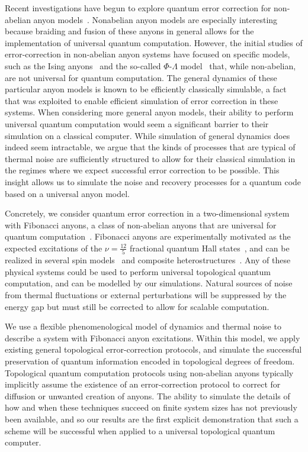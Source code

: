 Recent investigations have begun to
explore quantum error correction for non-abelian anyon
models~\cite{Brell2013, Wootton2013, Hutter2014, Wootton2015b, Hutter2015continuous}.
Nonabelian anyon models are especially interesting 
because braiding and fusion of
these anyons in general allows for the implementation of universal quantum 
computation. However, the initial studies
of error-correction in non-abelian anyon
systems have focused on specific models, such as the Ising 
anyons~\cite{Brell2013, Hutter2015continuous} and the so-called $\Phi$-$\Lambda$
model~\cite{Wootton2013, Hutter2014} that, while non-abelian,
are not universal for quantum
computation. The general dynamics of
these particular anyon models is
known to be efficiently classically simulable, a fact
that was exploited to enable efficient simulation of error correction
in these systems. When considering more general anyon models, their 
ability to perform universal quantum computation would seem a significant
barrier to their simulation on a classical computer. While simulation 
of general dynamics does indeed seem intractable, we argue that 
the kinds of processes that are typical of thermal noise 
are sufficiently structured  to allow for their classical simulation
in the regimes where we expect successful error correction to
be possible. This insight allows us to simulate the noise
and recovery processes for a quantum code based on a universal anyon model.

Concretely, we consider quantum error correction in a two-dimensional
system with Fibonacci anyons, a class of non-abelian anyons that are universal for quantum
computation~\cite{Freedman2002, Nayak2008}. Fibonacci anyons are
experimentally motivated as the
expected excitations of the $\nu=\frac{12}{5}$ fractional quantum Hall
states~\cite{Slingerland2001}, and can be realized in several spin
models~\cite{Levin2005, Bonesteel2012, Kapit2013, Palumbo2014} and composite
heterostructures~\cite{Mong2014}.
Any of these physical systems
could be used to perform
universal topological quantum computation, and
can be modelled by our
simulations. Natural sources of noise
from thermal fluctuations or external
perturbations will be suppressed by
the energy gap but must still be corrected to allow for scalable computation.

We use a flexible phenomenological model of dynamics and thermal
noise to describe a system with Fibonacci anyon excitations. Within
this model, we apply existing general topological error-correction protocols, and
simulate the successful preservation of quantum information encoded in topological
degrees of freedom. Topological quantum computation protocols using non-abelian anyons
typically implicitly assume the existence of an error-correction protocol to
correct for diffusion or unwanted creation of anyons.
The ability to simulate the details of how and when
these techniques succeed on finite
system sizes has not previously
been available, and so our
results are the first explicit
demonstration that such a scheme
will be successful when applied
to a universal topological quantum computer.

